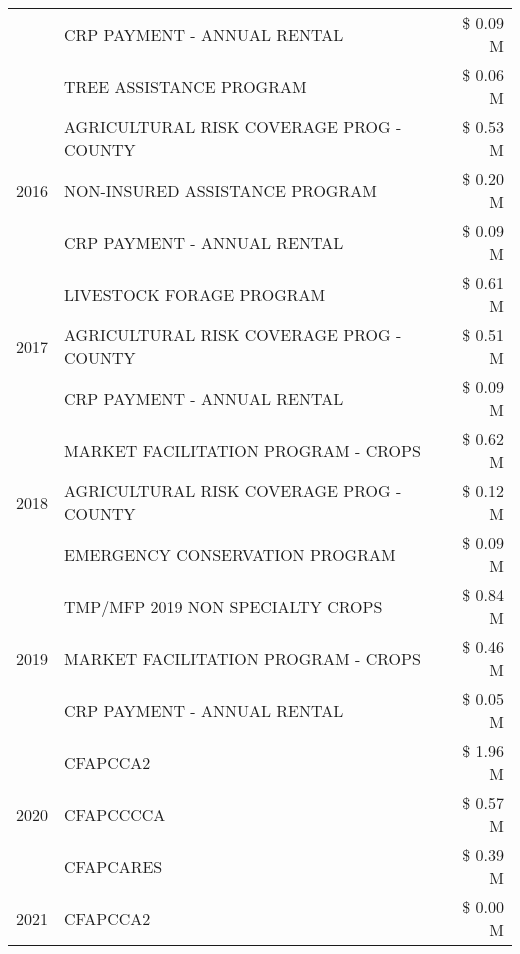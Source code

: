 \begin{tabular}{llr}
 & CRP PAYMENT - ANNUAL RENTAL & \$ 0.09 M \\
 & TREE ASSISTANCE PROGRAM & \$ 0.06 M \\
\cline{1-3}
\multirow[t]{3}{*}{2016} & AGRICULTURAL RISK COVERAGE PROG - COUNTY & \$ 0.53 M \\
 & NON-INSURED ASSISTANCE PROGRAM & \$ 0.20 M \\
 & CRP PAYMENT - ANNUAL RENTAL & \$ 0.09 M \\
\cline{1-3}
\multirow[t]{3}{*}{2017} & LIVESTOCK FORAGE PROGRAM & \$ 0.61 M \\
 & AGRICULTURAL RISK COVERAGE PROG - COUNTY & \$ 0.51 M \\
 & CRP PAYMENT - ANNUAL RENTAL & \$ 0.09 M \\
\cline{1-3}
\multirow[t]{3}{*}{2018} & MARKET FACILITATION PROGRAM - CROPS & \$ 0.62 M \\
 & AGRICULTURAL RISK COVERAGE PROG - COUNTY & \$ 0.12 M \\
 & EMERGENCY CONSERVATION PROGRAM & \$ 0.09 M \\
\cline{1-3}
\multirow[t]{3}{*}{2019} & TMP/MFP 2019 NON SPECIALTY CROPS & \$ 0.84 M \\
 & MARKET FACILITATION PROGRAM - CROPS & \$ 0.46 M \\
 & CRP PAYMENT - ANNUAL RENTAL & \$ 0.05 M \\
\cline{1-3}
\multirow[t]{3}{*}{2020} & CFAPCCA2 & \$ 1.96 M \\
 & CFAPCCCCA & \$ 0.57 M \\
 & CFAPCARES & \$ 0.39 M \\
\cline{1-3}
2021 & CFAPCCA2 & \$ 0.00 M \\
\cline{1-3}
\bottomrule
\end{tabular}
